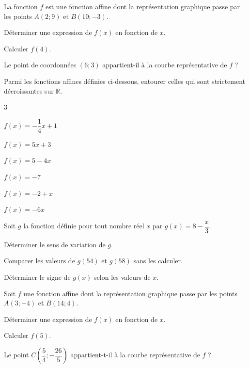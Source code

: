 \documentclass[11pt,a4paper]{article}  %
\begin{document}



La fonction $f$ est une fonction affine dont la représentation graphique passe par les points $A(2 ; 9)$ et $B(10 ;-3)$.
\begin{enumMet}
	\item Déterminer une expression de $f(x)$ en fonction de $x$.
	\item Calculer $f(4)$.
	\item Le point de coordonnées $(6 ; 3)$ appartient-il à la courbe représentative de $f$ ?
	
\end{enumMet}

Parmi les fonctions affines définies ci-dessous, entourer celles qui sont strictement décroissantes sur $\mathbb{R}$.
\begin{multicols}{3}
	\begin{enumMet}
		\item $f(x)=-\dfrac{1}{4} x+1$
		\item $f(x)=5 x+3$
		\item $f(x)=5-4x$
		\item $f(x)=-7$
		\item $f(x)=-2+x$
		\item $f(x)=-6 x$
	\end{enumMet}
\end{multicols}


Soit $g$ la fonction définie pour tout nombre réel $x$ par $g(x)=8-\dfrac{x}{3}$.
\begin{enumMet}
	\item Déterminer le sens de variation de $g$. 
	\item Comparer les valeurs de $g(54)$ et $g(58)$ sans les calculer.
	\item Déterminer le signe de $g(x)$ selon les valeurs de $x$.
\end{enumMet}


Soit $f$ une fonction affine dont la représentation graphique passe par les points $A(3 ; -4)$ et $B(14 ; 4)$.
\begin{enumMet}
	\item Déterminer une expression de $f(x)$ en fonction de $x$.
	\item Calculer $f(5)$. 
	\item Le point $C\left(\dfrac{5}{4} ; -\dfrac{26}{5}\right)$ appartient-t-il à la courbe représentative de $f$ ?
\end{enumMet}
\end{document}
